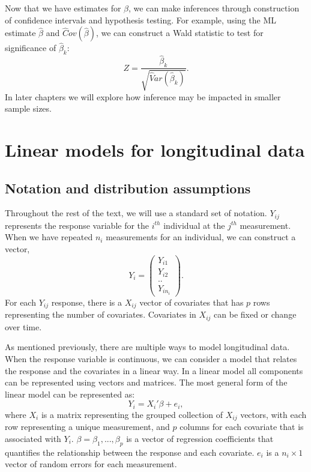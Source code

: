 \documentclass[12pt, twoside]{amherstthesis}
\begin{document}
Now that we have estimates for \(\beta\), we can make inferences through construction of confidence intervals and hypothesis testing. For example, using the ML estimate \(\hat\beta\) and \(\hat Cov(\hat\beta)\), we can construct a Wald statistic to test for significance of \(\hat \beta_k\):
\[Z = \frac{\hat \beta_k}{\sqrt{\hat Var(\hat \beta_k)}}.\] In later chapters we will explore how inference may be impacted in smaller sample sizes.

\hypertarget{linear-models-for-longitudinal-data}{%
\section{Linear models for longitudinal data}\label{linear-models-for-longitudinal-data}}

\hypertarget{notation-and-distribution-assumptions}{%
\subsection{Notation and distribution assumptions}\label{notation-and-distribution-assumptions}}

Throughout the rest of the text, we will use a standard set of notation. \(Y_{ij}\) represents the response variable for the \(i^{th}\) individual at the \(j^{th}\) measurement. When we have repeated \(n_i\) measurements for an individual, we can construct a vector, \[Y_i = \begin{pmatrix} Y_{i1}\\ Y_{i2} \\ .. \\  Y_{in_i}  \end{pmatrix}.\] For each \(Y_{ij}\) response, there is a \(X_{ij}\) vector of covariates that has \(p\) rows representing the number of covariates. Covariates in \(X_{ij}\) can be fixed or change over time.

As mentioned previously, there are multiple ways to model longitudinal data. When the response variable is continuous, we can consider a model that relates the response and the covariates in a linear way. In a linear model all components can be represented using vectors and matrices. The most general form of the linear model can be represented as:
\[Y_i=X_i'\beta + e_i,\] where \(X_i\) is a matrix representing the grouped collection of \(X_{ij}\) vectors, with each row representing a unique measurement, and \(p\) columns for each covariate that is associated with \(Y_i.\) \(\beta = \beta_1,...,\beta_p\) is a vector of regression coefficients that quantifies the relationship between the response and each covariate. \(e_i\) is a \(n_i \times 1\) vector of random errors for each measurement.
\end{document}
